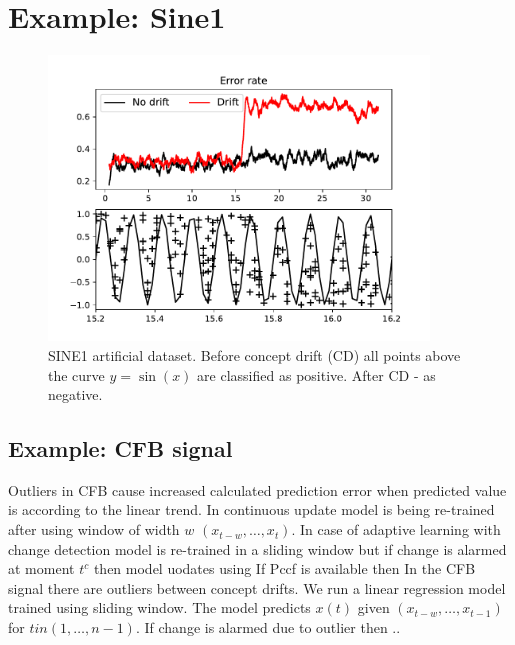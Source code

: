 \section{Example: Sine1}
\begin{figure}[!htb]
	\centering
	\includegraphics[width=0.9\textwidth]{images/cd_example_sine1}
	\caption{SINE1 artificial dataset. 
		Before concept drift (CD) all points above the curve $y=\sin(x)$ are classified as positive.
After CD - as negative.	
}\label{fig:sine1}
\end{figure}

\subsection{Example: CFB signal}

Outliers in CFB cause increased calculated prediction error when predicted value is according to the linear trend. 
In continuous update model is being re-trained after using window of width $w$ $(x_{t-w}, \dots, x_{t})$.
In case of adaptive learning with change detection model is re-trained in a sliding window but if change is alarmed at moment $t^c$ then model uodates using 
If Pccf is available then 
In the CFB signal there are outliers between concept drifts.
We run a linear regression model trained using sliding window.
The model predicts $x(t)$ given $(x_{t-w}, \dots, x_{t-1})$ for $t in (1, \dots, n-1)$.
If change is alarmed due to outlier then ..

